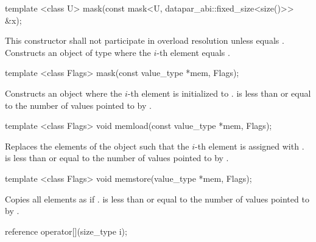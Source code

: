 \begin{itemdecl}
template <class U> mask(const mask<U, datapar_abi::fixed_size<size()>> &x);
\end{itemdecl}
\begin{itemdescr}
  \pnum\remarks This constructor shall not participate in overload resolution unless
     equals \fixedsizescoped{}.
  \pnum\effects Constructs an object of type \mask where the $i$-th element equals  \foralli.
\end{itemdescr}

\begin{itemdecl}
template <class Flags> mask(const value_type *mem, Flags);
\end{itemdecl}
\begin{itemdescr}
  \pnum\effects Constructs an object where the $i$-th element is initialized to  \foralli.
  \pnum\requires {} is less than or equal to the number of values pointed to by .
  \flagsRemarks{\mask{}}
\end{itemdescr}

\begin{itemdecl}
template <class Flags> void memload(const value_type *mem, Flags);
\end{itemdecl}
\begin{itemdescr}
  \pnum\effects Replaces the elements of the \mask object such that the $i$-th element is assigned with  \foralli.
  \pnum\requires {} is less than or equal to the number of values pointed to by .
  \flagsRemarks{\mask{}}
\end{itemdescr}

\begin{itemdecl}
template <class Flags> void memstore(value_type *mem, Flags);
\end{itemdecl}
\begin{itemdescr}
  \pnum\effects Copies all \mask elements as if  \foralli.
  \pnum\requires {} is less than or equal to the number of values pointed to by .
  \flagsRemarks{\mask{}}
\end{itemdescr}

\begin{itemdecl}
reference operator[](size_type i);
\end{itemdecl}
\begin{itemdescr}
  \dataparElementReference{\mask}
\end{itemdescr}

